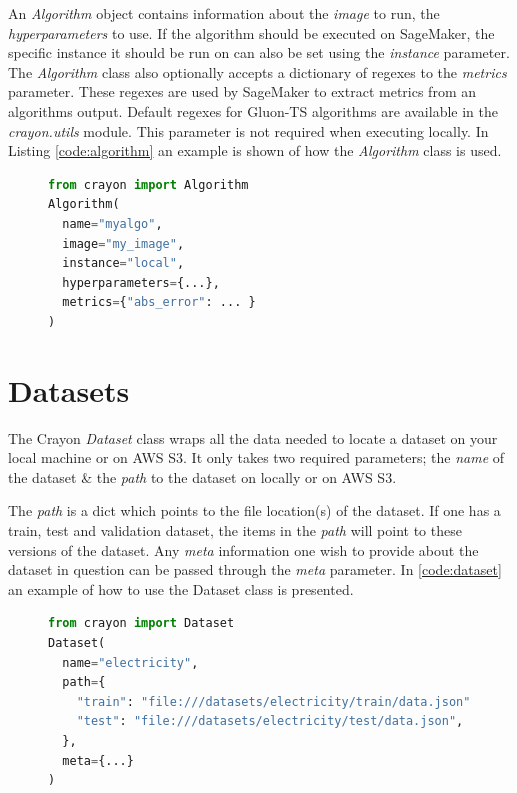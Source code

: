 An \textit{Algorithm} object contains information about the \textit{image} to run, the \textit{hyperparameters} to use. If the algorithm should be executed on SageMaker, the specific instance it should be run on can also be set using the \textit{instance} parameter. The \textit{Algorithm} class also optionally accepts a dictionary of regexes to the \textit{metrics} parameter. These regexes are used by SageMaker to extract metrics from an algorithms output. Default regexes for Gluon-TS algorithms are available in the \textit{crayon.utils} module. This parameter is not required when executing locally. In Listing \ref{code:algorithm} an example is shown of how the \textit{Algorithm} class is used.

\begin{figure}[h]
  \begin{lstlisting}[language=Python,label={code:algorithm},caption={Example of the Algorithm class.}]
from crayon import Algorithm
Algorithm(
  name="myalgo", 
  image="my_image", 
  instance="local",
  hyperparameters={...},
  metrics={"abs_error": ... }
)
  \end{lstlisting}

\end{figure}
\section{Datasets}
\label{crayon:datasets}
The Crayon \textit{Dataset} class wraps all the data needed to locate a dataset on your local machine or on AWS S3. It only takes two required parameters; the \textit{name} of the dataset \& the \textit{path} to the dataset on locally or on AWS S3.

The \textit{path} is a dict which points to the file location(s) of the dataset. If one has a train, test and validation dataset, the items in the \textit{path} will point to these versions of the dataset. Any \textit{meta} information one wish to provide about the dataset in question can be passed through the \textit{meta} parameter. In \ref{code:dataset} an example of how to use the Dataset class is presented.
\begin{figure}[h]
  \begin{lstlisting}[language=Python, label={code:dataset}, caption={Example of the Dataset class.}]
from crayon import Dataset
Dataset(
  name="electricity",
  path={
    "train": "file:///datasets/electricity/train/data.json",
    "test": "file:///datasets/electricity/test/data.json",
  },
  meta={...}
)
  \end{lstlisting}
\end{figure}
